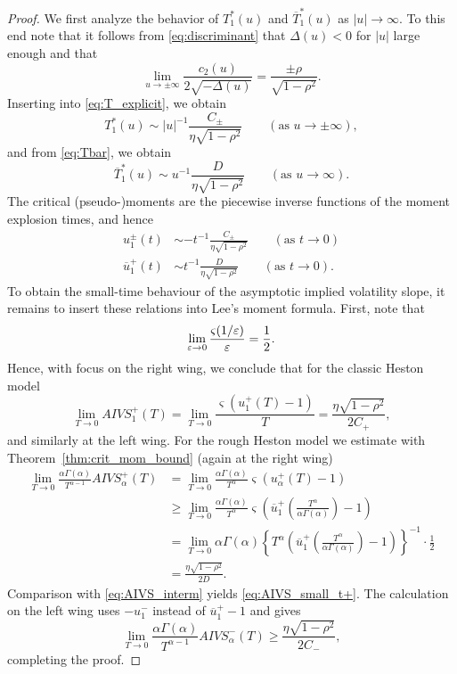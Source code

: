 \documentclass[12pt,a4paper]{amsart}
\numberwithin{equation}{section}
\numberwithin{equation}{section}
\theoremstyle{nonumberplain}
\renewcommand{\epsilon}{\ensuremath\varepsilon}
\begin{document}
\begin{proof}We first analyze the behavior of $T_1^*(u)$ and  $\overline T_1^*(u)$ as $|u| \to \infty$. To this end note that it follows from \eqref{eq:discriminant} that $\Delta(u) <  0$ for $|u|$ large enough and that 
\[\lim_{u \to \pm \infty} \frac{c_2(u)}{2 \sqrt{-\Delta(u)}} = \frac{\pm \rho}{\sqrt{1 - \rho^2}}.\]
Inserting into \eqref{eq:T_explicit}, we obtain
\[T_1^*(u) \sim |u|^{-1}\frac{C_\pm}{\eta \sqrt{1 - \rho^2}}  \qquad (\text{as }u \to \pm \infty),\]
and from \eqref{eq:Tbar}, we obtain
\[\overline T_1^*(u) \sim u^{-1}\frac{D}{\eta \sqrt{1 - \rho^2}} \qquad (\text{as }u \to \infty).\]
The critical (pseudo-)moments are the piecewise inverse functions of the moment explosion times, and hence
\begin{align*}
u_1^\pm(t) &\sim -t^{-1} \frac{C_\pm}{\eta \sqrt{1 - \rho^2}} \qquad (\text{as }t \to 0)\\
\overline u_1^+(t) &\sim t^{-1} \frac{D}{\eta \sqrt{1 - \rho^2}} \qquad (\text{as }t \to 0).
\end{align*}
To obtain the small-time behaviour of the asymptotic implied volatility slope, it remains to insert these relations into Lee's moment formula. First, note that
\[\lim_{\epsilon \to 0} \frac{\varsigma(1/\epsilon)}{\epsilon}  = \frac{1}{2}.\]
Hence, with focus on the right wing, we conclude that for the classic Heston model
\begin{equation}\label{eq:AIVS_interm}
\lim_{T \to 0} AIVS_1^+(T) = \lim_{T \to 0} \frac{\varsigma(u_1^+(T) - 1)}{T} = \frac{\eta \sqrt{1 - \rho^2}}{2C_+},
\end{equation}
and similarly at the left wing. For the rough Heston model we estimate with Theorem~\ref{thm:crit_mom_bound} (again at the right wing) 
\begin{align*}
\lim_{T \to 0} \frac{\alpha \Gamma(\alpha)}{T^{\alpha-1}} AIVS_\alpha^+(T) &= \lim_{T \to 0}  \frac{\alpha \Gamma(\alpha)}{T^{\alpha}} \varsigma(u_\alpha^+(T) - 1) \\
&\ge \lim_{T \to 0}  \frac{\alpha \Gamma(\alpha)}{T^{\alpha}} \varsigma\left(\overline u_1^+\left(\frac{T^\alpha}{\alpha \Gamma(\alpha)}\right) - 1\right) \\
&= \lim_{T \to 0} \alpha \Gamma(\alpha) \left\{T^\alpha \left(\overline u_1^+\left(\frac{T^\alpha}{\alpha \Gamma(\alpha)}\right) - 1\right) \right\}^{-1} \cdot 
\frac{1}{2} \\
&= \frac{\eta \sqrt{1 - \rho^2}}{2 D}.
\end{align*}
Comparison with \eqref{eq:AIVS_interm} yields \eqref{eq:AIVS_small_t+}. The calculation on the left wing uses $-u_1^-$ instead of $\overline u_1^+ - 1$ and gives
\[\lim_{T \to 0} \frac{\alpha \Gamma(\alpha)}{T^{\alpha-1}} AIVS_\alpha^- (T) \ge  \frac{\eta \sqrt{1 - \rho^2}}{2 C_-},\]
completing the proof.
\end{proof}
\end{document}

